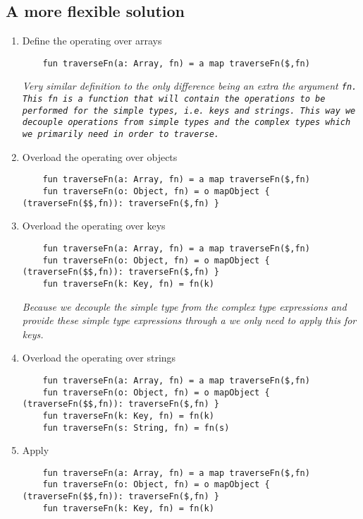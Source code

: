 \subsection{A more flexible solution}
\begin{enumerate}[resume*]
\item Define the  operating over arrays
  \begin{lstlisting}
    fun traverseFn(a: Array, fn) = a map traverseFn($,fn)
  \end{lstlisting}
  \emph{
    Very similar definition to  the only difference being an extra the argument \tt{fn}.  This \tt{fn} is a function that will contain the operations to be performed for the simple types, i.e. keys and strings.  This way we decouple operations from simple types and the complex types which we primarily need in order to traverse. 
  }
\item Overload the  operating over objects
  \begin{lstlisting}
    fun traverseFn(a: Array, fn) = a map traverseFn($,fn)
    fun traverseFn(o: Object, fn) = o mapObject { (traverseFn($$,fn)): traverseFn($,fn) }
  \end{lstlisting}
\item Overload the  operating over keys
  \begin{lstlisting}
    fun traverseFn(a: Array, fn) = a map traverseFn($,fn)
    fun traverseFn(o: Object, fn) = o mapObject { (traverseFn($$,fn)): traverseFn($,fn) }
    fun traverseFn(k: Key, fn) = fn(k)
  \end{lstlisting}
  \emph{
    Because we decouple the simple type from the complex type expressions and provide these simple type expressions through a \les{} we only need to apply this \les{} for keys. 
  }
\item Overload the  operating over strings
  \begin{lstlisting}
    fun traverseFn(a: Array, fn) = a map traverseFn($,fn)
    fun traverseFn(o: Object, fn) = o mapObject { (traverseFn($$,fn)): traverseFn($,fn) }
    fun traverseFn(k: Key, fn) = fn(k)
    fun traverseFn(s: String, fn) = fn(s)
  \end{lstlisting}
\item Apply 
  \begin{lstlisting}
    fun traverseFn(a: Array, fn) = a map traverseFn($,fn)
    fun traverseFn(o: Object, fn) = o mapObject { (traverseFn($$,fn)): traverseFn($,fn) }
    fun traverseFn(k: Key, fn) = fn(k)

\end{lstlisting}
\end{enumerate}
